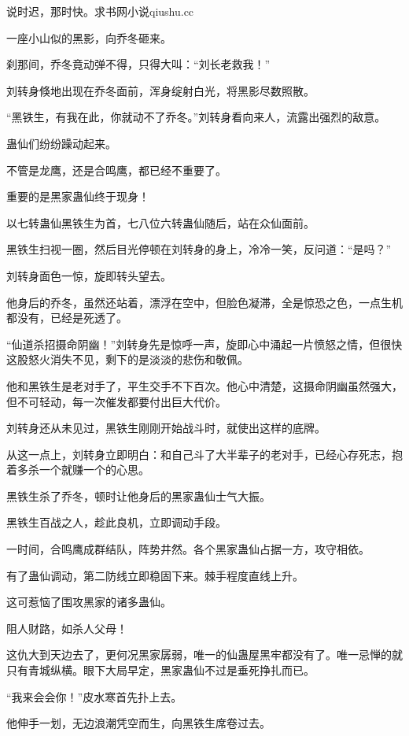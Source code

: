 
\begin{this_body}

说时迟，那时快。求书网小说qiushu.cc

一座小山似的黑影，向乔冬砸来。

刹那间，乔冬竟动弹不得，只得大叫：“刘长老救我！”

刘转身倏地出现在乔冬面前，浑身绽射白光，将黑影尽数照散。

“黑铁生，有我在此，你就动不了乔冬。”刘转身看向来人，流露出强烈的敌意。

蛊仙们纷纷躁动起来。

不管是龙鹰，还是合鸣鹰，都已经不重要了。

重要的是黑家蛊仙终于现身！

以七转蛊仙黑铁生为首，七八位六转蛊仙随后，站在众仙面前。

黑铁生扫视一圈，然后目光停顿在刘转身的身上，冷冷一笑，反问道：“是吗？”

刘转身面色一惊，旋即转头望去。

他身后的乔冬，虽然还站着，漂浮在空中，但脸色凝滞，全是惊恐之色，一点生机都没有，已经是死透了。

“仙道杀招摄命阴幽！”刘转身先是惊呼一声，旋即心中涌起一片愤怒之情，但很快这股怒火消失不见，剩下的是淡淡的悲伤和敬佩。

他和黑铁生是老对手了，平生交手不下百次。他心中清楚，这摄命阴幽虽然强大，但不可轻动，每一次催发都要付出巨大代价。

刘转身还从未见过，黑铁生刚刚开始战斗时，就使出这样的底牌。

从这一点上，刘转身立即明白：和自己斗了大半辈子的老对手，已经心存死志，抱着多杀一个就赚一个的心思。

黑铁生杀了乔冬，顿时让他身后的黑家蛊仙士气大振。

黑铁生百战之人，趁此良机，立即调动手段。

一时间，合鸣鹰成群结队，阵势井然。各个黑家蛊仙占据一方，攻守相依。

有了蛊仙调动，第二防线立即稳固下来。棘手程度直线上升。

这可惹恼了围攻黑家的诸多蛊仙。

阻人财路，如杀人父母！

这仇大到天边去了，更何况黑家孱弱，唯一的仙蛊屋黑牢都没有了。唯一忌惮的就只有青城纵横。眼下大局早定，黑家蛊仙不过是垂死挣扎而已。

“我来会会你！”皮水寒首先扑上去。

他伸手一划，无边浪潮凭空而生，向黑铁生席卷过去。


\end{this_body}
